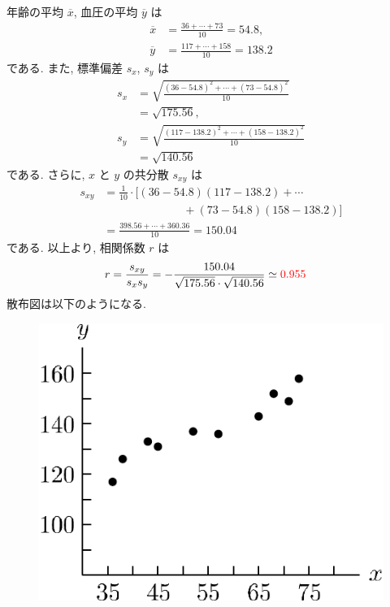 \begin{qenumerate}
{\begin{figure}[H]
		\end{figure}
	}
	\item{
		年齢の平均 $\overline{x}$, 血圧の平均 $\overline{y}$ は
		\begin{align}
			\overline{x} &= \frac{36 + \cdots + 73}{10} = 54.8, \\
			\overline{y} &= \frac{117 + \cdots + 158}{10} = 138.2
		\end{align}
		である.
		また, 標準偏差 $s_{x}$, $s_{y}$ は
		\begin{align}
			s_{x} &= \sqrt{\frac{(36 - 54.8)^{2} + \cdots + (73 - 54.8)^{2}}{10}} \\
				&= \sqrt{175.56}, \\
			s_{y} &= \sqrt{\frac{(117 - 138.2)^{2} + \cdots + (158 - 138.2)^{2}}{10}} \\
				&= \sqrt{140.56}
		\end{align}
		である.
		さらに, $x$ と $y$ の共分散 $s_{xy}$ は
		\begin{align}
			s_{xy} &= \frac{1}{10}\cdot[(36 - 54.8)(117 - 138.2) + \cdots \\
				&\quad\quad\quad\quad\quad\quad\quad + (73 - 54.8)(158 - 138.2)] \\
				&= \frac{398.56 + \cdots + 360.36}{10} = 150.04
		\end{align}
		である.
		以上より, 相関係数 $r$ は
		\begin{align}
			r &= \frac{s_{xy}}{s_{x}s_{y}} = -\frac{150.04}{\sqrt{175.56}\cdot \sqrt{140.56}} \simeq \textcolor{red}{0.955}
		\end{align}
		散布図は以下のようになる.
		\begin{figure}[H]
			\centering
			\includegraphics[scale = 0.5]{./figure/91.pdf}

\end{figure}}
\end{qenumerate}
